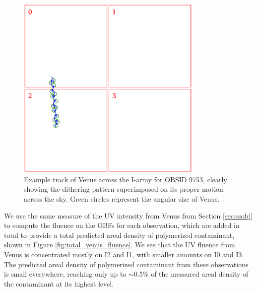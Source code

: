 \documentclass[11pt]{article}
\begin{document}
\begin{figure}
\begin{center}
\includegraphics[width=0.8\textwidth]{venus_track.eps}
\caption{Example track of Venus across the I-array for OBSID 9753, clearly showing the dithering pattern superimposed
on its proper motion across the sky. Green circles represent the angular size of Venus.\label{fig:venus_track}}
\end{center}
\end{figure}

We use the same measure of the UV intensity from Venus from Section \ref{sec:ssobj} to compute the fluence on the OBFs
for each observation, which are added in total to provide a total predicted areal density of polymerized contaminant,
shown in Figure \ref{fig:total_venus_fluence}. We see that the UV fluence from Venus is concentrated mostly on I2 and
I1, with smaller amounts on I0 and I3. The predicted areal density of polymerized contaminant from these observations
is small everywhere, reaching only up to $\sim$0.5\% of the measured areal density of the contaminant at its highest level.
\end{document}
